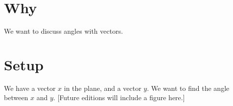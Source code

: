 
\section*{Why}

We want to discuss angles with vectors.
\section*{Setup}

We have a vector $x$ in the plane, and a vector $y$.
We want to find the angle between $x$ and $y$.
[Future editions will include a figure here.]
\blankpage